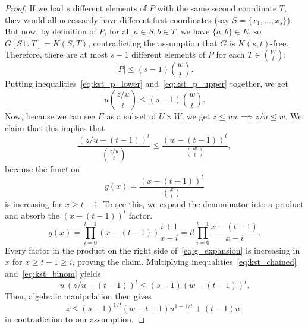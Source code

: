 \begin{theorem}
\begin{proof}
        If we had $s$ different elements of $P$ with the same second coordinate $T$,
        they would all necessarily have different first coordinates
        (say $S = \{x_1, \dots, x_s\}$).
        But now, by definition of $P$, for all $a \in S, b \in T$, we have $\{a, b\} \in E$,
        so $G[S \cup T] = K(S, T)$, contradicting the assumption that $G$ is $K(s, t)$-free.
        Therefore, there are at most $s - 1$ different elements of $P$ for each $T \in \binom{W}{t}$:
        \begin{equation} \label{eq:kst_p_upper}
            |P| \leq (s - 1) \binom{w}{t}.
        \end{equation}
        Putting inequalities~\eqref{eq:kst_p_lower} and~\eqref{eq:kst_p_upper}
        together, we get
        \begin{equation} \label{eq:kst_chained}
            u \binom{z / u}{t} \leq (s - 1) \binom{w}{t}.
        \end{equation}
        Now, because we can see $E$ as a subset of $U \times W$,
        we get $z \leq uw \implies z/u \leq w$.
        We claim that this implies that
        \begin{equation} \label{eq:kst_binom}
            \frac{(z/u - (t - 1))^t}{\binom{z/u}{t}} \leq \frac{(w - (t - 1))^t}{\binom{w}{t}},
        \end{equation}
        because the function
        \[
            g(x) = \frac{(x - (t - 1))^t}{\binom{x}{t}}
        \]
        is increasing for $x \geq t - 1$.
        To see this, we expand the denominator into a product and absorb the $(x - (t - 1))^t$ factor.
        \begin{equation} \label{eq:g_expansion}
            g(x) = \prod_{i=0}^{t-1} (x-(t-1)) \frac{i+1}{x-i} = t! \prod_{i=0}^{t-1} \frac{x-(t-1)}{x-i}.
        \end{equation}
        Every factor in the product on the right side of~\eqref{eq:g_expansion} is increasing
        in $x$ for $x \geq t - 1 \geq i$, proving the claim.
        Multiplying inequalities~\eqref{eq:kst_chained} and~\eqref{eq:kst_binom} yields
        \[
            u \, (z/u - (t - 1))^t \leq (s - 1)(w - (t - 1))^t.
        \]
        Then, algebraic manipulation then gives
        \[
            z \leq (s - 1)^{1 / t}(w - t + 1)u^{1 - 1 / t} + (t - 1)u,
        \]
        in contradiction to our assumption. \qedhere
    \end{proof}

\end{theorem}

